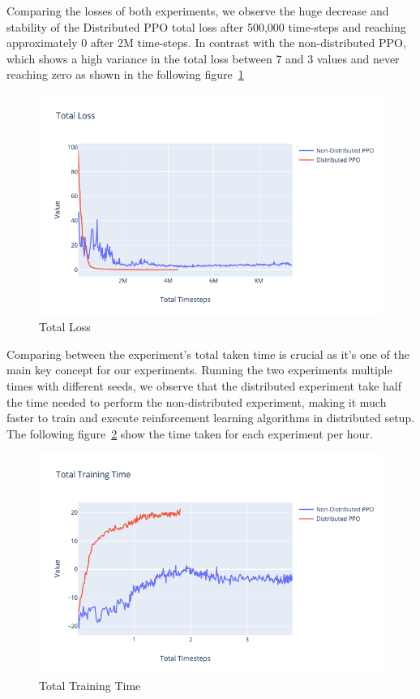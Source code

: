 Comparing the losses of both experiments, we observe the huge decrease and stability of the Distributed PPO total loss after 500,000 time-steps and reaching approximately 0 after 2M time-steps. In contrast with the non-distributed PPO, which shows a high variance in the total loss between 7 and 3 values and never reaching zero as shown in the following figure~\ref{fig:2nd_exp_total_loss}
\begin{figure}[!htb]
		\centering
		\includegraphics[width=\linewidth]{figures/exps/2nd_exp/total_loss.png}
		\caption{Total Loss}
		\label{fig:2nd_exp_total_loss}
\end{figure}

Comparing between the experiment's total taken time is crucial as it's one of the main key concept for our experiments. Running the two experiments multiple times with different seeds, we observe that the distributed experiment take half the time needed to perform the non-distributed experiment, making it much faster to train and execute reinforcement learning algorithms in distributed setup. The following figure~\ref{fig:2nd_exp_total_training_time} show the time taken for each experiment per hour.
\begin{figure}[!htb]
		\centering
		\includegraphics[width=\linewidth]{figures/exps/2nd_exp/total_training_time.png}
		\caption{Total Training Time}
		\label{fig:2nd_exp_total_training_time}
\end{figure}


